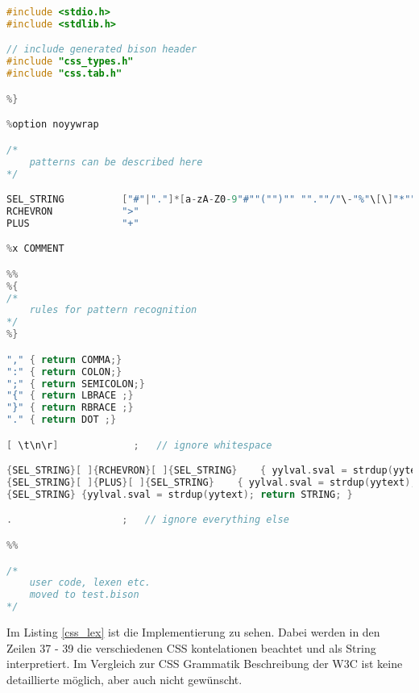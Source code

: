 \begin{lstlisting}[label=css_lex,language=C, caption=Beschreibung der CSS Grammatik in Lex]
%{
#include <stdio.h>
#include <stdlib.h>

// include generated bison header
#include "css_types.h"
#include "css.tab.h"

%}

%option noyywrap

/* 
    patterns can be described here
*/

SEL_STRING			["#"|"."]*[a-zA-Z0-9"#""("")"" "".""/"\-"%"\[\]"*""_""=""!""@""'""?"]+
RCHEVRON			">"
PLUS				"+"

%x COMMENT

%%
%{
/*
    rules for pattern recognition
*/
%}

"," { return COMMA;}
":" { return COLON;}
";" { return SEMICOLON;}
"{" { return LBRACE ;}
"}" { return RBRACE ;}
"." { return DOT ;}

[ \t\n\r]             ;   // ignore whitespace

{SEL_STRING}[ ]{RCHEVRON}[ ]{SEL_STRING}	{ yylval.sval = strdup(yytext); return STRING; }
{SEL_STRING}[ ]{PLUS}[ ]{SEL_STRING}	{ yylval.sval = strdup(yytext); return STRING; }
{SEL_STRING} {yylval.sval = strdup(yytext); return STRING; }

.                   ;   // ignore everything else

%%

/*
    user code, lexen etc.
    moved to test.bison
*/
\end{lstlisting} 
Im Listing \ref{css_lex} ist die Implementierung zu sehen. Dabei werden in den Zeilen 37 - 39 die verschiedenen CSS kontelationen beachtet und als String interpretiert. Im Vergleich zur CSS Grammatik Beschreibung der W3C ist keine detaillierte möglich, aber auch nicht gewünscht.
